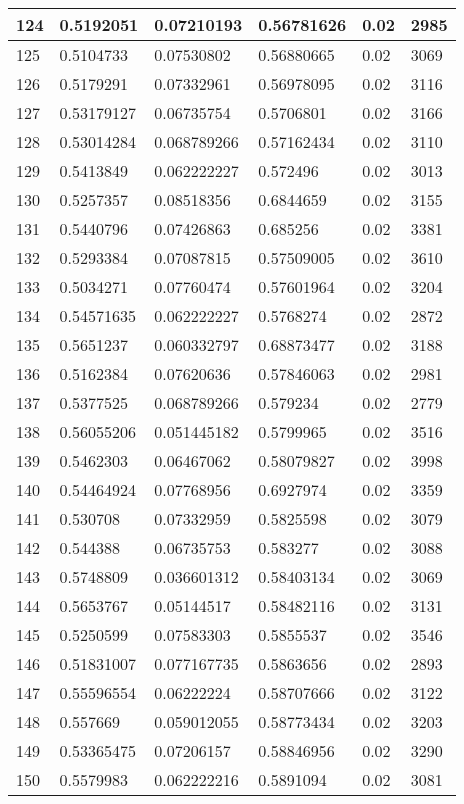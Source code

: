 \begin{longtable}{|l|l|l|l|l|l|}
124 & 0.5192051 & 0.07210193 & 0.56781626 & 0.02 & 2985 \\ \hline 
125 & 0.5104733 & 0.07530802 & 0.56880665 & 0.02 & 3069 \\ \hline 
126 & 0.5179291 & 0.07332961 & 0.56978095 & 0.02 & 3116 \\ \hline 
127 & 0.53179127 & 0.06735754 & 0.5706801 & 0.02 & 3166 \\ \hline 
128 & 0.53014284 & 0.068789266 & 0.57162434 & 0.02 & 3110 \\ \hline 
129 & 0.5413849 & 0.062222227 & 0.572496 & 0.02 & 3013 \\ \hline 
130 & 0.5257357 & 0.08518356 & 0.6844659 & 0.02 & 3155 \\ \hline 
131 & 0.5440796 & 0.07426863 & 0.685256 & 0.02 & 3381 \\ \hline 
132 & 0.5293384 & 0.07087815 & 0.57509005 & 0.02 & 3610 \\ \hline 
133 & 0.5034271 & 0.07760474 & 0.57601964 & 0.02 & 3204 \\ \hline 
134 & 0.54571635 & 0.062222227 & 0.5768274 & 0.02 & 2872 \\ \hline 
135 & 0.5651237 & 0.060332797 & 0.68873477 & 0.02 & 3188 \\ \hline 
136 & 0.5162384 & 0.07620636 & 0.57846063 & 0.02 & 2981 \\ \hline 
137 & 0.5377525 & 0.068789266 & 0.579234 & 0.02 & 2779 \\ \hline 
138 & 0.56055206 & 0.051445182 & 0.5799965 & 0.02 & 3516 \\ \hline 
139 & 0.5462303 & 0.06467062 & 0.58079827 & 0.02 & 3998 \\ \hline 
140 & 0.54464924 & 0.07768956 & 0.6927974 & 0.02 & 3359 \\ \hline 
141 & 0.530708 & 0.07332959 & 0.5825598 & 0.02 & 3079 \\ \hline 
142 & 0.544388 & 0.06735753 & 0.583277 & 0.02 & 3088 \\ \hline 
143 & 0.5748809 & 0.036601312 & 0.58403134 & 0.02 & 3069 \\ \hline 
144 & 0.5653767 & 0.05144517 & 0.58482116 & 0.02 & 3131 \\ \hline 
145 & 0.5250599 & 0.07583303 & 0.5855537 & 0.02 & 3546 \\ \hline 
146 & 0.51831007 & 0.077167735 & 0.5863656 & 0.02 & 2893 \\ \hline 
147 & 0.55596554 & 0.06222224 & 0.58707666 & 0.02 & 3122 \\ \hline 
148 & 0.557669 & 0.059012055 & 0.58773434 & 0.02 & 3203 \\ \hline 
149 & 0.53365475 & 0.07206157 & 0.58846956 & 0.02 & 3290 \\ \hline 
150 & 0.5579983 & 0.062222216 & 0.5891094 & 0.02 & 3081 \\ \hline 
\end{longtable}